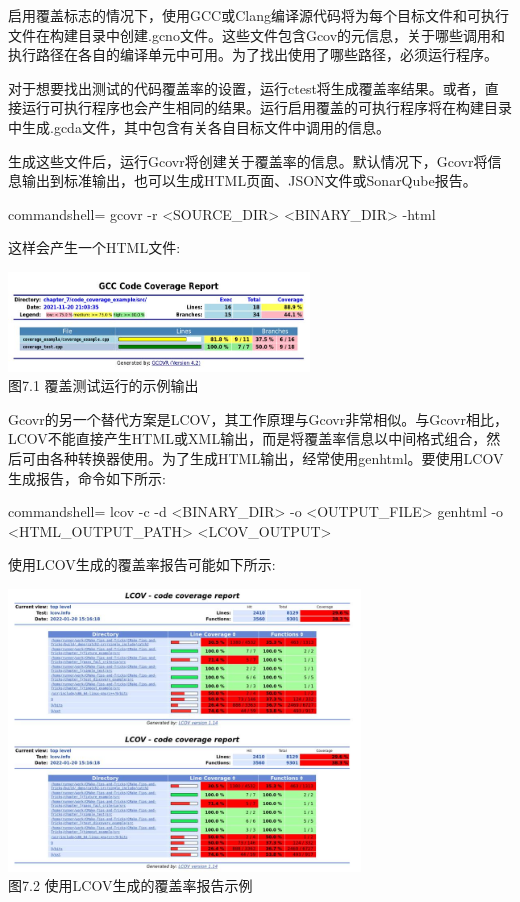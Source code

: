 启用覆盖标志的情况下，使用GCC或Clang编译源代码将为每个目标文件和可执行文件在构建目录中创建.gcno文件。这些文件包含Gcov的元信息，关于哪些调用和执行路径在各自的编译单元中可用。为了找出使用了哪些路径，必须运行程序。

对于想要找出测试的代码覆盖率的设置，运行ctest将生成覆盖率结果。或者，直接运行可执行程序也会产生相同的结果。运行启用覆盖的可执行程序将在构建目录中生成.gcda文件，其中包含有关各自目标文件中调用的信息。

生成这些文件后，运行Gcovr将创建关于覆盖率的信息。默认情况下，Gcovr将信息输出到标准输出，也可以生成HTML页面、JSON文件或SonarQube报告。

\begin{tcblisting}{commandshell={}}
gcovr -r <SOURCE_DIR> <BINARY_DIR> -html
\end{tcblisting}

这样会产生一个HTML文件:

\begin{center}
\includegraphics[width=0.6\textwidth]{content/2/chapter7/images/1.jpg}\\
图7.1 覆盖测试运行的示例输出
\end{center}

Gcovr的另一个替代方案是LCOV，其工作原理与Gcovr非常相似。与Gcovr相比，LCOV不能直接产生HTML或XML输出，而是将覆盖率信息以中间格式组合，然后可由各种转换器使用。为了生成HTML输出，经常使用genhtml。要使用LCOV生成报告，命令如下所示:

\begin{tcblisting}{commandshell={}}
lcov -c -d <BINARY_DIR> -o <OUTPUT_FILE>
genhtml -o <HTML_OUTPUT_PATH> <LCOV_OUTPUT>
\end{tcblisting}

使用LCOV生成的覆盖率报告可能如下所示:

\begin{center}
\includegraphics[width=0.7\textwidth]{content/2/chapter7/images/2.jpg}\\
图7.2 使用LCOV生成的覆盖率报告示例
\end{center}

